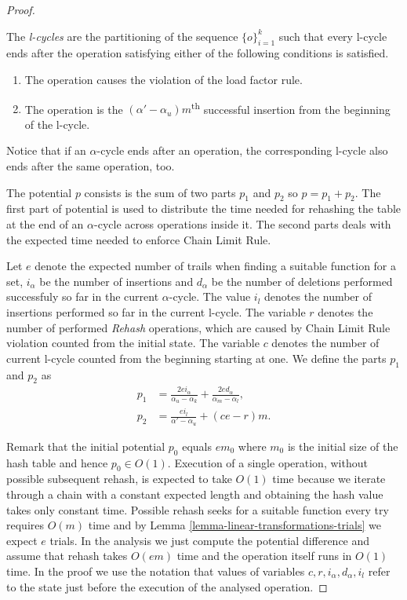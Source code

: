 \documentclass[runningheads,a4paper]{llncs}
\begin{document}
\begin{proof}
\begin{definition}[l-cycle]
The \emph{l-cycles} are the partitioning of the sequence $\{o\}_{i = 1}^{k}$ such that every l-cycle ends after the operation satisfying either of the following conditions is satisfied.
\begin{enumerate}
\item The operation causes the violation of the load factor rule.
\item The operation is the $(\alpha' - \alpha_u) m$\textsuperscript{th} successful insertion from the beginning of the l-cycle.
\end{enumerate}
\end{definition}
Notice that if an $\alpha$-cycle ends after an operation, the corresponding l-cycle also ends after the same operation, too. 

The potential $p$ consists is the sum of two parts $p_1$ and $p_2$ so $p = p_1 + p_2$. The first part of potential is used to distribute the time needed for rehashing the table at the end of an $\alpha$-cycle across operations inside it. The second parts deals with the expected time needed to enforce Chain Limit Rule.

Let $e$ denote the expected number of trails when finding a suitable function for a set, $i_{\alpha}$ be the number of insertions and $d_{\alpha}$ be the number of deletions performed successfuly so far in the current $\alpha$-cycle. The value $i_l$ denotes the number of insertions performed so far in the current l-cycle. The variable $r$ denotes the number of performed \emph{Rehash} operations, which are caused by Chain Limit Rule violation counted from the initial state. The variable $c$ denotes the number of current l-cycle counted from the beginning starting at one. We define the parts $p_1$ and $p_2$ as
\[
\begin{split}
p_1 & = \frac{2ei_{\alpha}}{\alpha_u - \alpha_k} + \frac{2ed_{\alpha}}{\alpha_m - \alpha_l}, \\
p_2 & = \frac{ei_{l}}{\alpha' - \alpha_u} + (ce - r) m.
\end{split}
\]

Remark that the initial potential $p_0$ equals $em_0$ where $m_0$ is the initial size of the hash table and hence $p_0 \in O(1)$. Execution of a single operation, without possible subsequent rehash, is expected to take $O(1)$ time because we iterate through a chain with a constant expected length and obtaining the hash value takes only constant time. Possible rehash seeks for a suitable function every try requires $O(m)$ time and by Lemma \ref{lemma-linear-transformations-trials} we expect $e$ trials. In the analysis we just compute the potential difference and assume that rehash takes $O(em)$ time and the operation itself runs in $O(1)$ time. In the proof we use the notation that values of variables $c, r, i_\alpha, d_\alpha, i_l$ refer to the state just before the execution of the analysed operation.


\end{proof}
\end{document}
